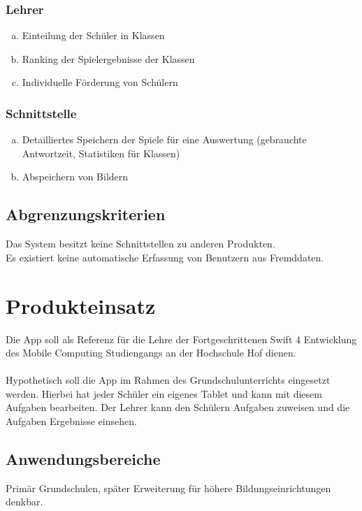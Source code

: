 \subsubsection{Lehrer}
\begin{enumerate}[a)]
\item Einteilung der Schüler in Klassen
\item Ranking der Spielergebnisse der Klassen
\item Individuelle Förderung von Schülern
\end{enumerate}


\subsubsection{Schnittstelle}
\begin{enumerate}[a)]
\item Detailliertes Speichern der Spiele für eine Auswertung (gebrauchte Antwortzeit, Statistiken für Klassen)
\item Abspeichern von Bildern
\end{enumerate}


\subsection{Abgrenzungskriterien}
Das System besitzt keine Schnittstellen zu anderen Produkten.\\ %
Es existiert keine automatische Erfassung von Benutzern aus Fremddaten.

\section{Produkteinsatz}
Die App soll als Referenz für die Lehre der Fortgeschrittenen Swift 4 Entwicklung des Mobile Computing Studiengangs an der Hochschule Hof dienen.\\
\\
Hypothetisch soll die App im Rahmen des Grundschulunterrichts eingesetzt werden. Hierbei hat jeder Schüler ein eigenes Tablet und kann mit diesem Aufgaben bearbeiten. Der Lehrer kann den Schülern Aufgaben zuweisen und die Aufgaben Ergebnisse einsehen.  

\subsection{Anwendungsbereiche}
Primär Grundschulen, später Erweiterung für höhere Bildungseinrichtungen denkbar. 

